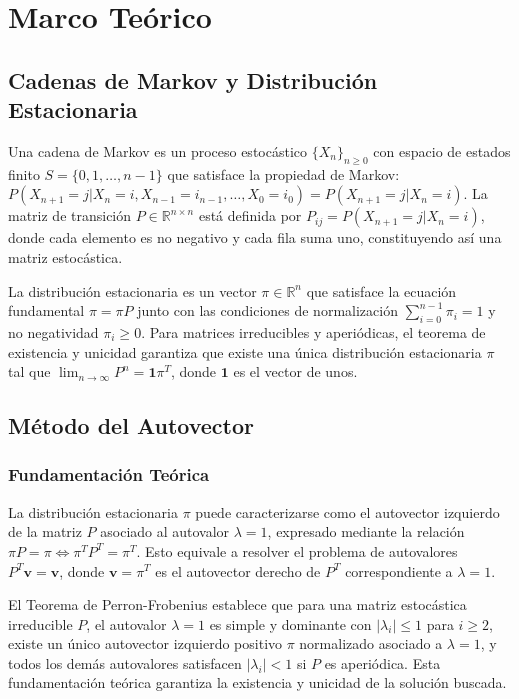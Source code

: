 \section{Marco Teórico}

\subsection{Cadenas de Markov y Distribución Estacionaria}

Una cadena de Markov es un proceso estocástico $\{X_n\}_{n \geq 0}$ con espacio de estados finito $S = \{0, 1, \ldots, n-1\}$ que satisface la propiedad de Markov: $P(X_{n+1} = j | X_n = i, X_{n-1} = i_{n-1}, \ldots, X_0 = i_0) = P(X_{n+1} = j | X_n = i)$. La matriz de transición $P \in \mathbb{R}^{n \times n}$ está definida por $P_{ij} = P(X_{n+1} = j | X_n = i)$, donde cada elemento es no negativo y cada fila suma uno, constituyendo así una matriz estocástica.

La distribución estacionaria es un vector $\pi \in \mathbb{R}^n$ que satisface la ecuación fundamental $\pi = \pi P$ junto con las condiciones de normalización $\sum_{i=0}^{n-1} \pi_i = 1$ y no negatividad $\pi_i \geq 0$. Para matrices irreducibles y aperiódicas, el teorema de existencia y unicidad garantiza que existe una única distribución estacionaria $\pi$ tal que $\lim_{n \to \infty} P^n = \mathbf{1}\pi^T$, donde $\mathbf{1}$ es el vector de unos.

\subsection{Método del Autovector}

\subsubsection{Fundamentación Teórica}

La distribución estacionaria $\pi$ puede caracterizarse como el autovector izquierdo de la matriz $P$ asociado al autovalor $\lambda = 1$, expresado mediante la relación $\pi P = \pi \Leftrightarrow \pi^T P^T = \pi^T$. Esto equivale a resolver el problema de autovalores $P^T \mathbf{v} = \mathbf{v}$, donde $\mathbf{v} = \pi^T$ es el autovector derecho de $P^T$ correspondiente a $\lambda = 1$.

El Teorema de Perron-Frobenius establece que para una matriz estocástica irreducible $P$, el autovalor $\lambda = 1$ es simple y dominante con $|\lambda_i| \leq 1$ para $i \geq 2$, existe un único autovector izquierdo positivo $\pi$ normalizado asociado a $\lambda = 1$, y todos los demás autovalores satisfacen $|\lambda_i| < 1$ si $P$ es aperiódica. Esta fundamentación teórica garantiza la existencia y unicidad de la solución buscada.


